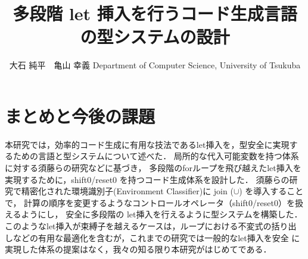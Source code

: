 \documentclass[T]{compsoft}
\theoremstyle{break}
\begin{document}
\title{多段階 let 挿入を行うコード生成言語の型システムの設計}

%
\author{大石 純平　亀山 幸義
%
%
%
%
%
{Department of Computer Science, University of Tsukuba}}


\maketitle \thispagestyle {empty}




%


\section{まとめと今後の課題}
本研究では，効率的コード生成に有用な技法であるlet挿入を，型安全に実現す
るための言語と型システムについて述べた．
局所的な代入可能変数を持つ体系に対する須藤らの研究\cite{Sudo2014}などに基づき，
多段階のforループを飛び越えたlet挿入を実現するために，shift0/reset0 を持つコード生成体系を設計した．
須藤らの研究で精密化された環境識別子(Environment Classifier)に join ($\cup$) を導入することで，
計算の順序を変更するようなコントロールオペレータ（shift0/reset0）を扱えるようにし，
安全に多段階の let挿入を行えるように型システムを構築した．
このようなlet挿入が束縛子を越えるケースは，ループにおける不変式の括り出
しなどの有用な最適化を含むが，これまでの研究では一般的なlet挿入を安全
に実現した体系の提案はなく，我々の知る限り本研究がはじめてである．
\end{document}
